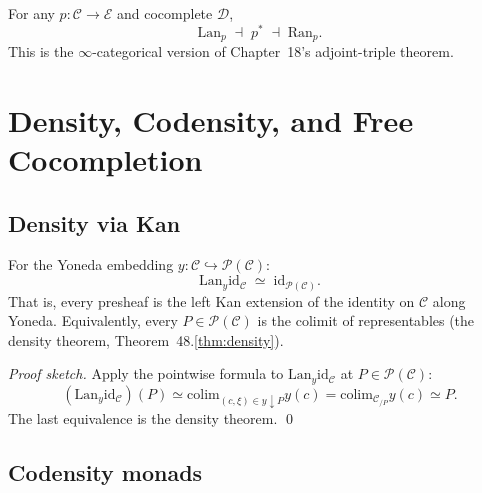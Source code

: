\begin{theorem}
\label{thm:kan-triple}
For any $p : \mathcal{C} \to \mathcal{E}$ and cocomplete $\mathcal{D}$,
\begin{equation*}
  \mathrm{Lan}_p \;\dashv\; p^* \;\dashv\; \mathrm{Ran}_p.
\end{equation*}
This is the $\infty$-categorical version of Chapter~18's adjoint-triple
theorem.
\end{theorem}


\section{Density, Codensity, and Free Cocompletion}
\label{sec:density-codensity}

\subsection{Density via Kan}

\begin{theorem}
\label{thm:density-via-kan}
For the Yoneda embedding $y : \mathcal{C} \hookrightarrow \mathcal{P}(\mathcal{C})$:
\begin{equation*}
  \mathrm{Lan}_y \mathrm{id}_\mathcal{C} \;\simeq\; \mathrm{id}_{\mathcal{P}(\mathcal{C})}.
\end{equation*}
That is, every presheaf is the left Kan extension of the identity on
$\mathcal{C}$ along Yoneda. Equivalently, every $P \in \mathcal{P}(\mathcal{C})$
is the colimit of representables (the density theorem,
Theorem~48.\ref{thm:density}).
\end{theorem}

\begin{proof}[Proof sketch]
Apply the pointwise formula to $\mathrm{Lan}_y \mathrm{id}_\mathcal{C}$
at $P \in \mathcal{P}(\mathcal{C})$:
\begin{equation*}
  (\mathrm{Lan}_y \mathrm{id}_\mathcal{C})(P) \simeq
  \mathrm{colim}_{(c, \xi) \in y \downarrow P} y(c) = \mathrm{colim}_{\mathcal{C}_{/P}} y(c) \simeq P.
\end{equation*}
The last equivalence is the density theorem. \qed
\end{proof}

\subsection{Codensity monads}

